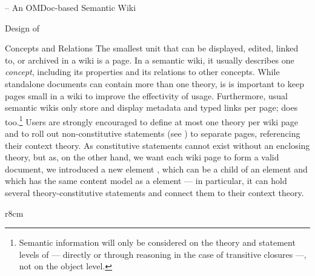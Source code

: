 \begin{omgroup}[id=swim,creators={clange,miko}]{{\swim} -- An OMDoc-based Semantic Wiki}
\begin{omgroup}{Design of {\swim}}
\begin{omgroup}{Concepts and Relations}
The smallest unit that can be displayed, edited, linked to, or archived in a wiki is a
page. In a semantic wiki, it usually describes one {\emph{concept}}, including its
properties and its relations to other concepts.  While standalone {\omdoc} documents can
contain more than one theory, is is important to keep pages small in a wiki to improve the
effectivity of usage.  Furthermore, usual semantic wikis only store and display metadata
and typed links per page; {\swim} does too.\footnote{Semantic information will only be
  considered on the theory and statement levels of {\omdoc} --- directly or through
  reasoning in the case of transitive closures ---, not on the object level.}  Users are
strongly encouraged to define at most one theory per wiki page and to roll out
non-constitutive statements (see {}) to separate pages,
referencing their context theory.  As constitutive statements cannot exist without an
enclosing theory, but as, on the other hand, we want each wiki page to form a valid
document, we introduced a new element {}, which can be a child
of an {} element and which has the same content model as a
{} element --- in particular, it can hold several theory-constitutive
statements and connect them to their context theory.
\begin{wrapfigure}{r}{8cm}
\end{wrapfigure}
\end{omgroup}
\end{omgroup}
\end{omgroup}
